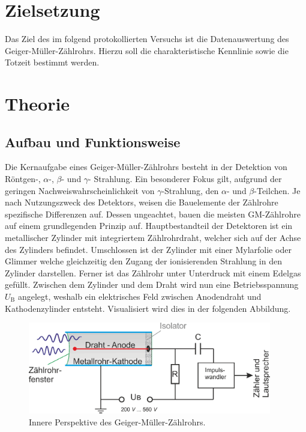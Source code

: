 



\section{Zielsetzung}
\label{sec:Zielsetzung}

Das Ziel des im folgend protokollierten Versuchs ist die Datenauswertung des Geiger-Müller-Zählrohrs. Hierzu soll die 
charakteristische Kennlinie sowie die Totzeit bestimmt werden.

\section{Theorie}
\label{sec:Theorie}

\subsection{Aufbau und Funktionsweise}

\noindent Die Kernaufgabe eines Geiger-Müller-Zählrohrs besteht in der Detektion von Röntgen-, $\alpha$-, $\beta$- und $\gamma$-
Strahlung. Ein besonderer Fokus gilt, aufgrund der geringen Nachweiswahrscheinlichkeit von $\gamma$-Strahlung, den
$\alpha$- und $\beta$-Teilchen. Je nach Nutzungszweck des Detektors, weisen die Bauelemente der Zählrohre spezifische 
Differenzen auf. Dessen ungeachtet, bauen die meisten GM-Zählrohre auf einem grundlegenden Prinzip auf. Hauptbestandteil 
der Detektoren ist ein metallischer Zylinder mit integriertem Zählrohrdraht, welcher sich auf der Achse des Zylinders 
befindet. Umschlossen ist der Zylinder mit einer Mylarfolie oder Glimmer welche gleichzeitig den Zugang der ionisierenden 
Strahlung in den Zylinder darstellen. Ferner ist das Zählrohr unter Unterdruck mit einem Edelgas gefüllt. Zwischen dem 
Zylinder und dem Draht wird nun eine Betriebsspannung $U_\text{B}$ angelegt, weshalb ein elektrisches Feld zwischen 
Anodendraht und Kathodenzylinder entsteht. Visualisiert wird dies in der folgenden Abbildung.

\begin{figure}
    \centering
    \includegraphics[height=4cm]{Aufbau1.png}
    \caption{Innere Perspektive des Geiger-Müller-Zählrohrs\cite{Aufbau1_GM}.}
    \label{fig:GM-Rohr}
\end{figure}

